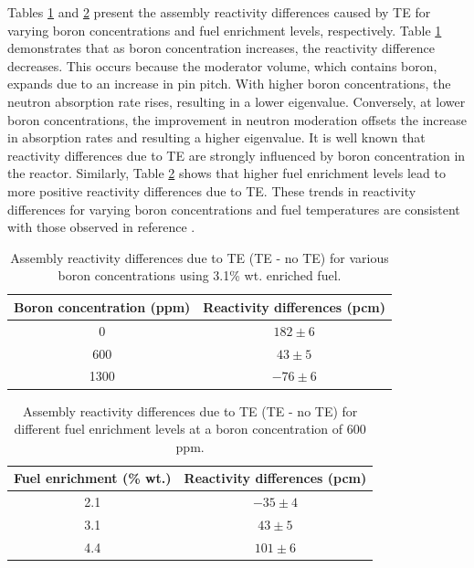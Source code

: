 Tables \ref{tab421} and \ref{tab422} present the assembly reactivity differences caused by TE for varying boron concentrations and fuel enrichment levels, respectively. Table \ref{tab421} demonstrates that as boron concentration increases, the reactivity difference decreases. This occurs because the moderator volume, which contains boron, expands due to an increase in pin pitch. With higher boron concentrations, the neutron absorption rate rises, resulting in a lower eigenvalue. Conversely, at lower boron concentrations, the improvement in neutron moderation offsets the increase in absorption rates and resulting a higher eigenvalue. It is well known that reactivity differences due to TE are strongly influenced by boron concentration in the reactor. Similarly, Table \ref{tab422} shows that higher fuel enrichment levels lead to more positive reactivity differences due to TE. These trends in reactivity differences for varying boron concentrations and fuel temperatures are consistent with those observed in reference \cite{palmtag}.

\begin{table}
    \centering
    \caption[Assembly reactivity differences for various boron concentrations]{Assembly reactivity differences due to TE (TE - no TE) for various boron concentrations using 3.1\% wt. enriched fuel.}
    \label{tab421} 
    \begin{tabular}{| c | c |}
    \hline 
     Boron concentration (ppm) & Reactivity differences (pcm) \\
     \hline
     0        & $182\pm6$     \\ \hline
     600      & $43\pm5$     \\ \hline
     1300     & $-76\pm6$    \\ \hline
    \end{tabular}
\end{table}

\begin{table}
    \centering
    \caption[Assembly reactivity differences for different fuel enrichments]{Assembly reactivity differences due to TE (TE - no TE) for different fuel enrichment levels at a boron concentration of 600 ppm.}
    \label{tab422} 
    \begin{tabular}{| c | c |}
    \hline 
    Fuel enrichment (\% wt.) & Reactivity differences (pcm) \\
     \hline
     2.1        & $-35\pm4$    \\ \hline
     3.1        & $43\pm5$     \\ \hline
     4.4        & $101\pm6$    \\ \hline
    \end{tabular}
\end{table}

